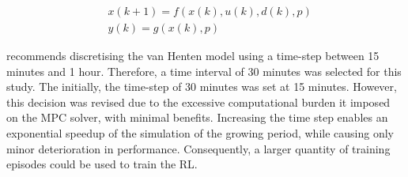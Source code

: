 \begin{equation}\label{eq:greenhouse_model_discrete}
	\begin{aligned}
		& x(k+1) = f(x(k),u(k),d(k),p) \\
		& y(k) = g(x(k),p)
	\end{aligned}
\end{equation}

\cite{vanstratenUserAcceptedOptimal2000} recommends discretising the van Henten model using a time-step between 15 minutes and 1 hour. Therefore, a time interval of 30 minutes was selected for this study. The initially, the time-step of 30 minutes was  set at 15 minutes. However, this decision was revised due to the excessive computational burden it imposed on the MPC solver, with minimal benefits. Increasing the time step enables an exponential speedup of the simulation of the growing period, while causing only minor deterioration in performance. Consequently, a larger quantity of training episodes could be used to train the RL.


